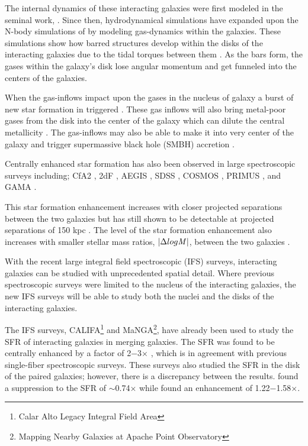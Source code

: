 \documentclass[iop,revtex4,twocolumn,apj,numberedappendix,appendixfloats]{emulateapj}
\begin{document}
The internal dynamics of these interacting galaxies were first modeled in the seminal work, \citet{Toomre:1972}. Since then, hydrodynamical simulations have expanded upon the N-body simulations of \citet{Toomre:1972} by modeling gas-dynamics within the galaxies. These simulations show how barred structures develop within the disks of the interacting galaxies due to the tidal torques between them \citep{Barnes:1991}. As the bars form, the gases within the galaxy's disk lose angular momentum and get funneled into the centers of the galaxies. 

When the gas-inflows impact upon the gases in the nucleus of galaxy a burst of new star formation in triggered \citep{Barnes:1996, Mihos:1996}. These gas inflows will also bring metal-poor gases from the disk into the center of the galaxy which can dilute the central metallicity \citep{Rupke:2010, Perez:2011, Scudder:2012}. The gas-inflows may also be able to make it into very center of the galaxy and trigger supermassive black hole (SMBH) accretion \citep{Capelo:2017}. 

Centrally enhanced star formation has also been observed in large spectroscopic surveys including; CfA2  \citep{Barton:2000, Woods:2006}, 2dF \citep{Lambas:2003}, AEGIS \citep{Lin:2007}, SDSS \citep{Ellison:2008}, COSMOS \citep{Kartaltepe:2007,Xu:2012}, PRIMUS \citep{Wong:2011}, and GAMA \citep{Robotham:2014}.

This star formation enhancement increases with closer projected separations between the two galaxies \citep{Ellison:2008, Scudder:2012} but has still shown to be detectable at projected separations of 150 kpc \citep{Patton:2013}. The level of the star formation enhancement also increases with smaller stellar mass ratios, $|\Delta log {\it M} |$, between the two galaxies \citep{Ellison:2008}. 

With the recent large integral field spectroscopic (IFS) surveys, interacting galaxies can be studied with unprecedented spatial detail. Where previous spectroscopic surveys were limited to the nucleus of the interacting galaxies, the new IFS surveys will be able to study both the nuclei and the disks of the interacting galaxies. 

The IFS surveys, CALIFA\footnote{Calar Alto Legacy Integral Field Area} and MaNGA\footnote{Mapping Nearby Galaxies at Apache Point Observatory}, have already been used to study the SFR of interacting galaxies in merging galaxies. The SFR was found to be centrally enhanced by a factor of 2$-$3$\times$ \citep{Barrera-Ballesteros:2015, Pan:2019}, which is in agreement with previous single-fiber spectroscopic surveys. These surveys also studied the SFR in the disk of the paired galaxies; however, there is a discrepancy between the results. \citet{Barrera-Ballesteros:2015} found a suppression to the SFR of $\sim$0.74$\times$ while \citet{Pan:2019} found an enhancement of 1.22$-$1.58$\times$. 
\end{document}
